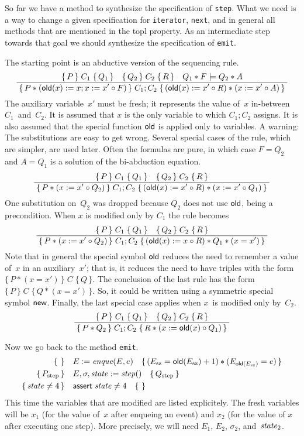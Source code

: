 \documentclass{article} %
\newcommand{\infer}[2]{\frac{\displaystyle\;#1\;}{\displaystyle\;#2\;}}
\newcommand{\3}[3]{\{\,#1\,\}\;#2\;\{\,#3\,\}}
\begin{document}
\medskip

So far we have a method to synthesize the specification of {\tt step}.
What we need is a way to change a given specification for {\tt iterator}, {\tt next}, and in general all methods that are mentioned in the topl property.
As an intermediate step towards that goal we should synthesize the specification of {\tt emit}.

The starting point is an abductive version of the sequencing rule.
\[
\infer
  {\3{P}{C_1}{Q_1}\quad\3{Q_2}{C_2}{R}\quad Q_1*F\models Q_2*A}
  {\3{P*({\sf old}(x):=x;x:=x'\circ F)}{C_1;C_2}{({\sf old}(x):=x'\circ R)*(x:=x'\circ A)}}
\]
The auxiliary variable~$x'$ must be fresh;
it represents the value of~$x$ in-between $C_1$~and~$C_2$.
It is assumed that $x$ is the only variable to which $C_1;C_2$ assigns.
It is also assumed that the special function ${\sf old}$ is applied only to variables.
A warning: The substitutions are easy to get wrong.
Several special cases of the rule, which are simpler, are used later.
Often the formulas are pure, in which case $F=Q_2$ and $A=Q_1$ is a solution of the bi-abduction equation.
\[
\infer
  {\3{P}{C_1}{Q_1}\quad\3{Q_2}{C_2}{R}}
  {\3{P*(x:=x'\circ Q_2)}{C_1;C_2}{({\sf old}(x):=x'\circ R)*(x:=x'\circ Q_1)}}
\]
One substitution on~$Q_2$ was dropped because $Q_2$ does not use ${\sf old}$, being a precondition.
When $x$ is modified only by $C_1$ the rule becomes
\[
\infer
  {\3{P}{C_1}{Q_1}\quad\3{Q_2}{C_2}{R}}
  {\3{P*(x:=x'\circ Q_2)}{C_1;C_2}{({\sf old}(x):=x\circ R)*Q_1*(x=x')}}
\]
Note that in general the special symbol ${\sf old}$ reduces the need to remember a value of~$x$ in an auxiliary~$x'$; that is, it reduces the need to have triples with the form $\3{P*(x=x')}{C}{Q}$.
The conclusion of the last rule has the form $\3{P}{C}{Q*(x=x')}$.
So, it could be written using a symmetric special symbol ${\sf new}$.
Finally, the last special case applies when $x$~is modified only by~$C_2$.
\[
\infer
  {\3{P}{C_1}{Q_1}\quad\3{Q_2}{C_2}{R}}
  {\3{P*Q_2}{C_1;C_2}{R*(x:={\sf old}(x)\circ Q_1)}}
\]

Now we go back to the method {\tt emit}.
\begin{align*}
\{\,\,\}\quad&E:={\it enque}(E,e)\quad
  \{\,(E_{\rm sz}={\sf old}(E_{\rm sz})+1)*(E_{{\sf old}(E_{\rm sz})}=e)\,\}\\
\{\,P_{\rm step}\,\}\quad&E,\sigma,{\it state}:={\it step}()\quad
  \{\,Q_{\rm step}\,\} \\
\{\,{\it state}\ne4\,\}\quad&{\sf assert}\;{\it state}\ne4\quad\{\,\,\}
\end{align*}
This time the variables that are modified are listed explicitely.
The fresh variables will be $x_1$ (for the value of~$x$ after enqueing an event) and $x_2$ (for the value of $x$ after executing one step).
More precisely, we will need $E_1$, $E_2$, $\sigma_2$, and~${\it state}_2$.
\end{document}
